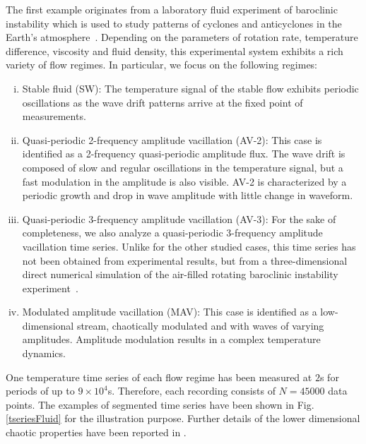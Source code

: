 \documentclass[aip,cha,reprint,nofootinbib]{revtex4-1}
\begin{document}
The first example originates from a laboratory fluid experiment of baroclinic instability which is used to study patterns of cyclones and anticyclones in the Earth's atmosphere~\cite{Read_jfm_1992,ZouEPJST2008}. Depending on the parameters of rotation rate, temperature difference, viscosity and fluid density, this experimental system exhibits a rich variety of flow regimes. In particular, we focus on the following regimes: 
\begin{enumerate}[(i)]
\item {Stable fluid (SW):} The temperature signal of the stable flow exhibits periodic oscillations as the wave drift patterns arrive at the fixed point of measurements. 
\item {Quasi-periodic 2-frequency amplitude vacillation (AV-2):} This case is identified as a 2-frequency quasi-periodic amplitude flux. The wave drift is composed of slow and regular oscillations in the temperature signal, but a fast modulation in the amplitude is also visible. AV-2 is characterized by a periodic growth and drop in wave amplitude with little change in waveform. 
\item {Quasi-periodic 3-frequency amplitude vacillation (AV-3):} For the sake of completeness, we also analyze a quasi-periodic 3-frequency amplitude vacillation time series. Unlike for the other studied cases, this time series has not been obtained from experimental results, but from a three-dimensional direct numerical simulation of the air-filled rotating baroclinic instability experiment~\cite{Read_jfm_1992}. 
\item {Modulated amplitude vacillation (MAV):} This case is identified as a low-dimensional stream, chaotically modulated and with waves of varying amplitudes. Amplitude modulation results in a complex temperature dynamics.
\end{enumerate}
{\color{red}One temperature time series of each flow regime has been measured at $2$s for periods of up to $9 \times 10^4$s. Therefore, each recording consists of $N = 45000$ data points. The examples of segmented time series have been shown in Fig. \ref{tseriesFluid} for the illustration purpose. Further details of the lower dimensional chaotic properties have been reported in \cite{Read_jfm_1992,thiel2004a}. }
\end{document}
